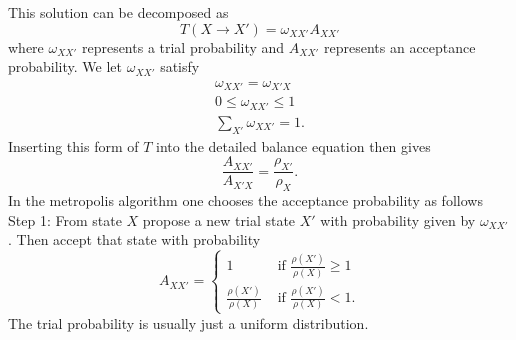 \documentclass[a4paper]{article}
\newcommand{\trm}[1]{\textrm{#1}}
\newcommand{\oxx}{\omega_{XX'}}
\begin{document}
This solution can be decomposed as
\begin{equation}
  T(X\rightarrow X') = \omega_{XX'} A_{XX'}
\end{equation}
where $\oxx$ represents a trial probability and $A_{XX'}$ represents an acceptance probability.
We let $\omega_{XX'}$ satisfy
\begin{align}
  \oxx = \omega_{X'X}\\
  0 \leq \oxx \leq 1\\
  \sum_{X'} \oxx = 1.
\end{align}
Inserting this form of $T$ into the detailed balance equation then gives
\begin{equation}
  \frac{A_{XX'}}{A_{X'X}} = \frac{\rho_{X'}}{\rho_{X}}.
\end{equation}
In the metropolis algorithm one chooses the acceptance probability as follows
Step 1: From state $X$ propose a new trial state $X'$ with probability given by $\oxx$. Then accept that state with probability 
\begin{equation}
  A_{XX'} = 
  \begin{cases}
    	1 &\trm{ if } \frac{\rho(X')}{\rho(X)} \geq 1\\
	\frac{\rho(X')}{\rho(X)}&\trm{ if } \frac{\rho(X')}{\rho(X)} < 1 .
  \end{cases}
\end{equation}
The trial probability is usually just a uniform distribution.
\end{document}

